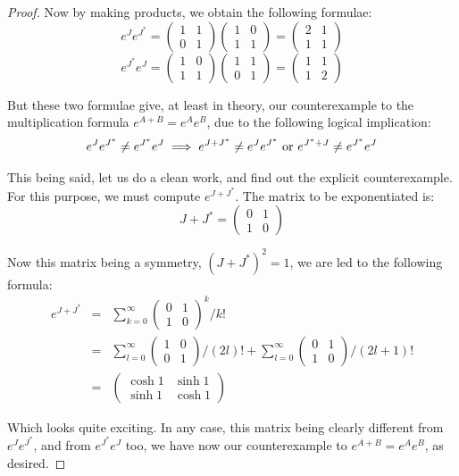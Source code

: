 \documentclass[12pt]{amsbook}
\begin{document}
\begin{proof}
Now by making products, we obtain the following formulae:
$$e^Je^{J^*}=\begin{pmatrix}1&1\\0&1\end{pmatrix}
\begin{pmatrix}1&0\\1&1\end{pmatrix}
=\begin{pmatrix}2&1\\1&1\end{pmatrix}$$
$$e^{J^*}e^J=\begin{pmatrix}1&0\\1&1\end{pmatrix}
\begin{pmatrix}1&1\\0&1\end{pmatrix}
=\begin{pmatrix}1&1\\1&2\end{pmatrix}$$

But these two formulae give, at least in theory, our counterexample to the multiplication formula $e^{A+B}=e^Ae^B$, due to the following logical implication:
$$e^Je^{J^*}\neq e^{J^*}e^J\implies e^{J+J^*}\neq e^Je^{J^*}\ {\rm or}\ e^{J^*+J}\neq e^{J^*}e^J$$

This being said, let us do a clean work, and find out the explicit counterexample. For this purpose, we must compute $e^{J+J^*}$. The matrix to be exponentiated is:
$$J+J^*=\begin{pmatrix}0&1\\1&0\end{pmatrix}$$

Now this matrix being a symmetry, $(J+J^*)^2=1$, we are led to the following formula:
\begin{eqnarray*}
e^{J+J^*}
&=&\sum_{k=0}^\infty\begin{pmatrix}0&1\\1&0\end{pmatrix}^k\Big/k!\\
&=&\sum_{l=0}^\infty\begin{pmatrix}1&0\\0&1\end{pmatrix}\Big/(2l)!
+\sum_{l=0}^\infty\begin{pmatrix}0&1\\1&0\end{pmatrix}\Big/(2l+1)!\\
&=&\begin{pmatrix}\cosh 1&\sinh 1\\ \sinh 1&\cosh 1\end{pmatrix}
\end{eqnarray*}

Which looks quite exciting. In any case, this matrix being clearly different from $e^Je^{J^*}$, and from $e^{J^*}e^J$ too, we have now our counterexample to $e^{A+B}=e^Ae^B$, as desired.
\end{proof}
\end{document}
